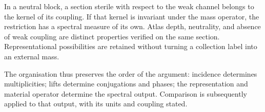 In a neutral block, a section sterile with respect to the weak
channel belongs to the kernel of its coupling. If that kernel is invariant
under the mass operator, the restriction has a spectral measure
of its own. Atlas depth, neutrality, and absence of weak
coupling are distinct properties verified on the same
section. Representational possibilities are retained without
turning a collection label into an external mass.

The organisation thus preserves the order of the argument: incidence
determines multiplicities; lifts determine
conjugations and phases; the representation and material operator
determine the spectral output. Comparison is subsequently applied to
that output, with its units and coupling stated.
